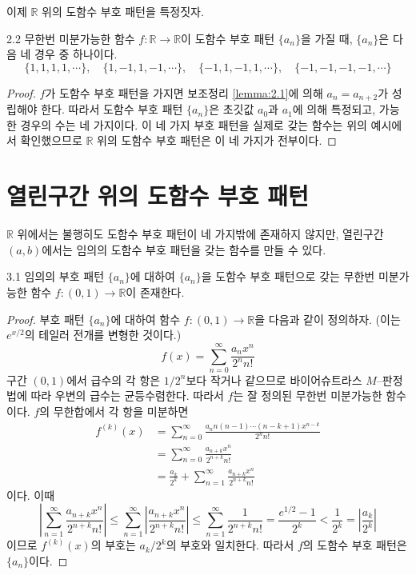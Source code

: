 \documentclass{article}
\begin{document}
이제 $\mathbb R$ 위의 도함수 부호 패턴을 특정짓자.

\begin{thm}{}{2.2}
    무한번 미분가능한 함수 $f:\mathbb R\to\mathbb R$이 도함수 부호 패턴 $\{a_n\}$을 가질 때, $\{a_n\}$은 다음 네 경우 중 하나이다.
    \[
        \{1,1,1,1,\cdots\},\quad \{1,-1,1,-1,\cdots\},\quad \{-1,1,-1,1,\cdots\},\quad \{-1,-1,-1,-1,\cdots\}
    \]
\end{thm}

\begin{proof}
    $f$가 도함수 부호 패턴을 가지면 보조정리 \ref{lemma:2.1}에 의해 $a_n=a_{n+2}$가 성립해야 한다. 따라서 도함수 부호 패턴 $\{a_n\}$은 초깃값 $a_0$과 $a_1$에 의해 특정되고, 가능한 경우의 수는 네 가지이다.
    이 네 가지 부호 패턴을 실제로 갖는 함수는 위의 예시에서 확인했으므로 $\mathbb R$ 위의 도함수 부호 패턴은 이 네 가지가 전부이다. 
\end{proof}

\section{열린구간 위의 도함수 부호 패턴}
$\mathbb R$ 위에서는 불행히도 도함수 부호 패턴이 네 가지밖에 존재하지 않지만, 열린구간 $(a,b)$에서는 임의의 도함수 부호 패턴을 갖는 함수를 만들 수 있다.

\begin{thm}{}{3.1}
    임의의 부호 패턴 $\{a_n\}$에 대하여 $\{a_n\}$을 도함수 부호 패턴으로 갖는 무한번 미분가능한 함수 $f:(0,1)\to\mathbb R$이 존재한다.
\end{thm}

\begin{proof}
    부호 패턴 $\{a_n\}$에 대하여 함수 $f:(0,1)\to\mathbb R$을 다음과 같이 정의하자. (이는 $e^{x/2}$의 테일러 전개를 변형한 것이다.)
    \[
        f(x)=\sum_{n=0}^\infty\frac{a_nx^n}{2^nn!}
    \]
    구간 $(0,1)$에서 급수의 각 항은 $1/2^n$보다 작거나 같으므로 바이어슈트라스 $M$--판정법에 따라 우변의 급수는 균등수렴한다. 따라서 $f$는 잘 정의된 무한번 미분가능한 함수이다. $f$의 무한합에서 각 항을 미분하면
    \[
        \begin{aligned}
            f^{(k)}(x)&=\sum_{n=0}^\infty\frac{a_nn(n-1)\cdots(n-k+1)x^{n-k}}{2^nn!}\\
            &=\sum_{n=0}^\infty\frac{a_{n+k}x^n}{2^{n+k}n!}\\
            &=\frac{a_k}{2^k}+\sum_{n=1}^\infty\frac{a_{n+k}x^n}{2^{n+k}n!}
        \end{aligned}
    \]
    이다. 이때
    \[
        \left\vert\sum_{n=1}^\infty\frac{a_{n+k}x^n}{2^{n+k}n!}\right\vert\leq\sum_{n=1}^\infty\left\vert\frac{a_{n+k}x^n}{2^{n+k}n!}\right\vert\leq\sum_{n=1}^\infty\frac{1}{2^{n+k}n!}=\frac{e^{1/2}-1}{2^k}<\frac{1}{2^k}=\left\vert\frac{a_k}{2^k}\right\vert
    \]
    이므로 $f^{(k)}(x)$의 부호는 $a_k/2^k$의 부호와 일치한다. 따라서 $f$의 도함수 부호 패턴은 $\{a_n\}$이다.
\end{proof}
\end{document}
